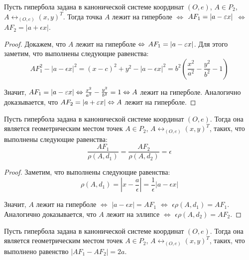     \begin{theorem}
    	Пусть гипербола задана в канонической системе координат $(O, e)$, $A \in P_2$, $A \leftrightarrow_{(O, e)} (x, y)^T$. Тогда точка $A$ лежит на гиперболе $\Leftrightarrow$ $AF_1 \hm{=} |a - \epsilon  x|$ $\Leftrightarrow$ $AF_2 = |a + \epsilon x|$.
    \end{theorem}
    
    \begin{proof}
    	Докажем, что $A$ лежит на гиперболе $\Leftrightarrow$ $AF_1 \hm{=} |a - \epsilon  x|$. Для этого заметим, что выполнены следующие равенства:
    	\[AF_1^2 - |a - \epsilon x|^2 = (x - c)^2 + y^2 - |a - \epsilon x|^2 = b^2\left(\frac{x^2}{a^2}-\frac{y^2}{b^2} - 1\right)\]
    	
    	Значит, $AF_1 = |a - \varepsilon x| \Leftrightarrow \frac{x^2}{a^2} - \frac{y^2}{b^2} = 1 \Leftrightarrow A$ лежит на гиперболе. Аналогично доказывается, что $AF_2 \hm{=} |a + \epsilon  x| \lra A$ лежит на гиперболе.
    \end{proof}
    
    \begin{corollary}
    	Пусть гипербола задана в канонической системе координат $(O, e)$. Тогда она является геометрическим местом точек $A \in P_2$, $A \leftrightarrow_{(O, e)} (x, y)^T$, таких, что выполнены следующие равенства:
    	\[\frac{AF_1}{\rho(A, d_1)} = \frac{AF_2}{\rho(A, d_2)} = \epsilon\]
    \end{corollary}
    
    \begin{proof}
    	Заметим, что выполнены следующие равенства:
    	\[\rho(A, d_1) = \left|x - \frac{a}{\epsilon}\right| = \frac{1}{\epsilon}|a - \epsilon x|\]
    	
    	Значит, $A$ лежит на гиперболе $\Leftrightarrow$ $|a - \epsilon x| = AF_1$ $\Leftrightarrow$ $\epsilon\rho(A, d_1) = AF_1$. Аналогично доказывается, что $A$ лежит на эллипсе $\Leftrightarrow$ $\epsilon\rho(A, d_2) = AF_2$.
    \end{proof}
    
    \begin{theorem}
    	Пусть гипербола задана в канонической системе координат $(O, e)$. Тогда она является геометрическим местом точек $A \in P_2$, $A \leftrightarrow_{(O, e)} (x, y)^T$, таких, что выполнено равенство $|AF_1 - AF_2| = 2a$.
    \end{theorem}
    
